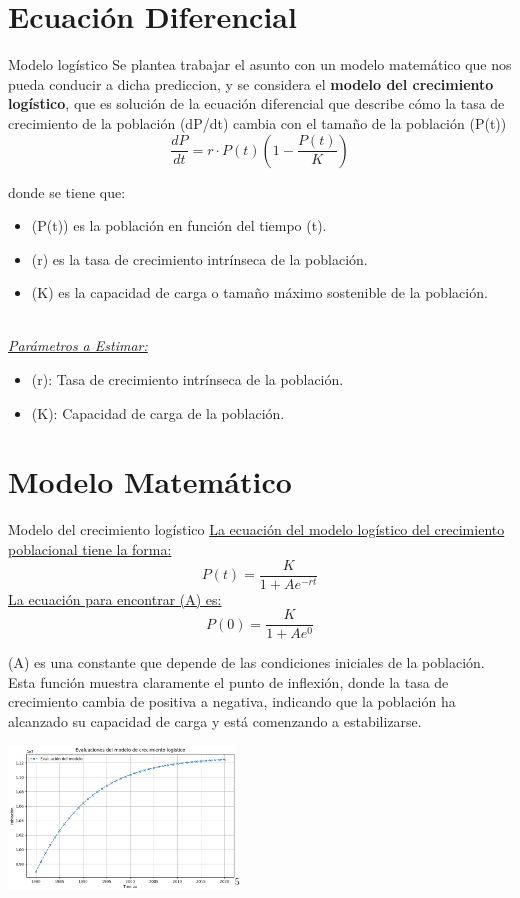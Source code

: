 \documentclass{beamer}
\begin{document}
\section{Ecuación Diferencial}
\begin{frame}{Modelo logístico}
    Se plantea trabajar el asunto con un modelo matemático que nos pueda conducir a dicha prediccion, y se considera 
    el \textbf{modelo del crecimiento logístico}, que es solución de la ecuación diferencial que describe cómo la tasa de crecimiento de la población (dP/dt) 
    cambia con el tamaño de la población (P(t)) $$\frac{dP}{dt} = r \cdot P(t)(1 - \frac{P(t)}{K}) $$
\end{frame}
\begin{frame}
donde se tiene que:
\begin{itemize}
    \item (P(t)) es la población en función del tiempo (t).
    \item (r) es la tasa de crecimiento intrínseca de la población.
    \item (K) es la capacidad de carga o tamaño máximo sostenible de la población.
\end{itemize}\\

\textit{\underline{Parámetros a Estimar:}}
\begin{itemize}
    \item (r): Tasa de crecimiento intrínseca de la población. 
    \item (K): Capacidad de carga de la población.
\end{itemize}
\end{frame}

\section{Modelo Matemático}
\begin{frame}{Modelo del crecimiento logístico}
    \underline{La ecuación del modelo logístico del crecimiento poblacional tiene la forma:} $$P(t) = \frac{K}{1 + Ae^{-rt}}$$
    \underline{La ecuación para encontrar (A) es:} $$P(0) = \frac{K}{1 + Ae^{0}}$$
\end{frame}

\begin{frame}
    (A) es una constante que depende de las condiciones iniciales de la población. Esta función muestra claramente 
    el punto de inflexión, donde la tasa de crecimiento cambia de positiva a negativa, indicando que la población 
    ha alcanzado su capacidad de carga y está comenzando a estabilizarse.
\begin{center}
    \includegraphics[width=0.45\textwidth]{img/model.png}$^{5}$\\
\end{center}
\end{frame}
\end{document}
